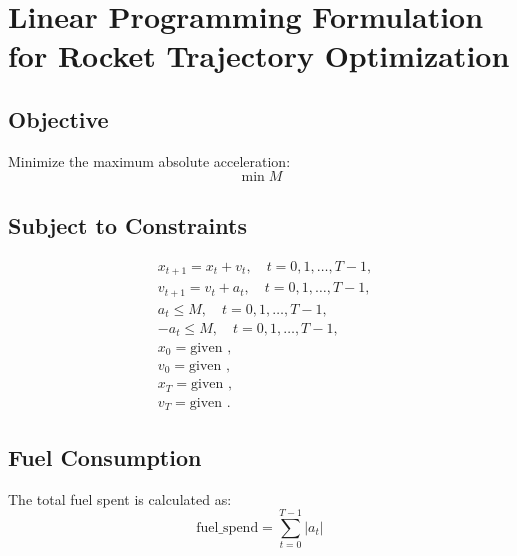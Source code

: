 \documentclass{article}
\begin{document}
\section*{Linear Programming Formulation for Rocket Trajectory Optimization}

\subsection*{Objective}
Minimize the maximum absolute acceleration:
\[
\min M
\]

\subsection*{Subject to Constraints}

\begin{align}
& x_{t+1} = x_t + v_t, \quad t = 0, 1, \ldots, T-1, \\
& v_{t+1} = v_t + a_t, \quad t = 0, 1, \ldots, T-1, \\
& a_t \leq M, \quad t = 0, 1, \ldots, T-1, \\
& -a_t \leq M, \quad t = 0, 1, \ldots, T-1, \\
& x_0 = \text{given }, \\
& v_0 = \text{given }, \\
& x_T = \text{given }, \\
& v_T = \text{given }.
\end{align}

\subsection*{Fuel Consumption}
The total fuel spent is calculated as:
\[
\text{fuel\_spend} = \sum_{t=0}^{T-1} |a_t|
\]
\end{document}
